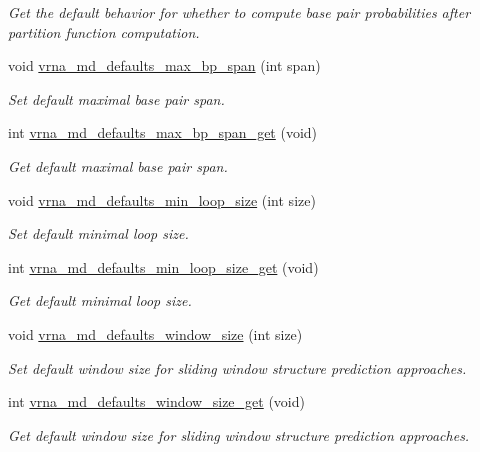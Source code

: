 \begin{DoxyCompactItemize}
\begin{DoxyCompactList}\small\item\em Get the default behavior for whether to compute base pair probabilities after partition function computation. \end{DoxyCompactList}\item 
void \hyperlink{group__model__details_ga4c4bc962f09b4480cb8499f1cf8ae4ec}{vrna\+\_\+md\+\_\+defaults\+\_\+max\+\_\+bp\+\_\+span} (int span)
\begin{DoxyCompactList}\small\item\em Set default maximal base pair span. \end{DoxyCompactList}\item 
int \hyperlink{group__model__details_gaa60f989e062fecd4d4bac89c1883da85}{vrna\+\_\+md\+\_\+defaults\+\_\+max\+\_\+bp\+\_\+span\+\_\+get} (void)
\begin{DoxyCompactList}\small\item\em Get default maximal base pair span. \end{DoxyCompactList}\item 
void \hyperlink{group__model__details_gac152f1e78c1058a10261022c8dfda0f7}{vrna\+\_\+md\+\_\+defaults\+\_\+min\+\_\+loop\+\_\+size} (int size)
\begin{DoxyCompactList}\small\item\em Set default minimal loop size. \end{DoxyCompactList}\item 
int \hyperlink{group__model__details_ga5cc691174a75c652807dc361b617632a}{vrna\+\_\+md\+\_\+defaults\+\_\+min\+\_\+loop\+\_\+size\+\_\+get} (void)
\begin{DoxyCompactList}\small\item\em Get default minimal loop size. \end{DoxyCompactList}\item 
void \hyperlink{group__model__details_ga7b802ce0e8c3181bf5cb580de6d5b26a}{vrna\+\_\+md\+\_\+defaults\+\_\+window\+\_\+size} (int size)
\begin{DoxyCompactList}\small\item\em Set default window size for sliding window structure prediction approaches. \end{DoxyCompactList}\item 
int \hyperlink{group__model__details_ga670146a9aa3ba77f4d422d60b7c30ac9}{vrna\+\_\+md\+\_\+defaults\+\_\+window\+\_\+size\+\_\+get} (void)
\begin{DoxyCompactList}\small\item\em Get default window size for sliding window structure prediction approaches. \end{DoxyCompactList}\item 

\end{DoxyCompactItemize}
